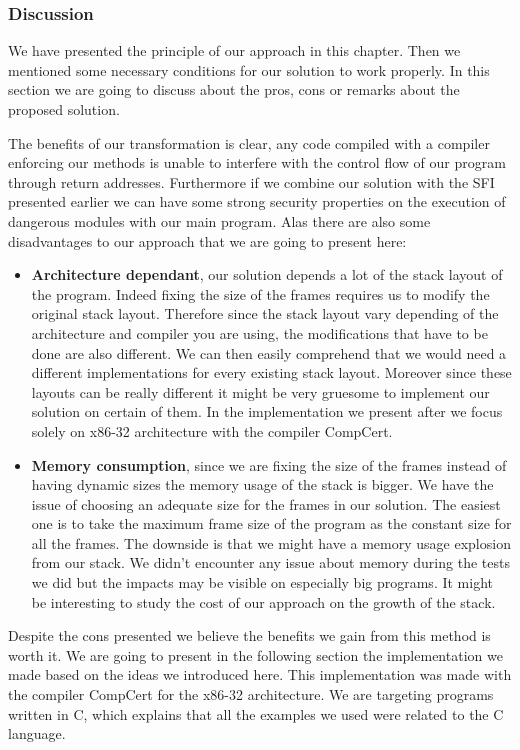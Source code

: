 \documentclass[11pt]{sdm}
\begin{document}
\subsubsection{Discussion}
\label{ssub:Discussion}
	We have presented the principle of our approach in this chapter. Then we mentioned some necessary conditions for our solution to work properly. In this section we are going to discuss about the pros, cons or remarks about the proposed solution.

	The benefits of our transformation is clear, any code compiled with a compiler enforcing our methods is unable to interfere with the control flow of our program through return addresses.
	Furthermore if we combine our solution with the SFI presented earlier we can have some strong security properties on the execution of dangerous modules with our main program.
Alas there are also some disadvantages to our approach that we are going to present here:
	\begin{itemize}
		\item \textbf{Architecture dependant}, our solution depends a lot of the stack layout of the program. Indeed fixing the size of the frames requires us to modify the original stack layout. Therefore since the stack layout vary depending of the architecture and compiler you are using, the modifications that have to be done are also different. We can then easily comprehend that we would need a different implementations for every existing stack layout. Moreover since these layouts can be really different it might be very gruesome to implement our solution on certain of them.
In the implementation we present after we focus solely on x86-32 architecture with the compiler CompCert.
		\item \textbf{Memory consumption}, since we are fixing the size of the frames instead of having dynamic sizes the memory usage of the stack is bigger. We have the issue of choosing an adequate size for the frames in our solution. The easiest one is to take the maximum frame size of the program as the constant size for all the frames. The downside is that we might have a memory usage explosion from our stack.
We didn't encounter any issue about memory during the tests we did but the impacts may be visible on especially big programs. It might be interesting to study the cost of our approach on the growth of the stack.
	\end{itemize}

Despite the cons presented we believe the benefits we gain from this method is worth it.
We are going to present in the following section the implementation we made based on the ideas we introduced here. This implementation was made with the compiler CompCert for the x86-32 architecture. We are targeting programs written in C, which explains that all the examples we used were related to the C language.
\end{document}
